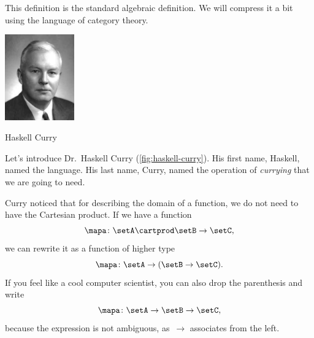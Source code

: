 This definition is the standard algebraic definition.
We will compress it a bit using the language of category theory.

\begin{marginfigure}
    \includegraphics[width=3cm]{../../../pics/haskell.jpg}
    \caption{Haskell Curry}
    \label{fig:haskell-curry}
\end{marginfigure}

Let's introduce Dr.~Haskell Curry (\cref{fig:haskell-curry}).
His first name,  Haskell, named the language.
His last name, Curry, named the operation of \emph{currying} that we are going to need.

Curry noticed that for describing the domain of a function, we do not need to have the Cartesian product.
If we have a function
\begin{equation}
    \label{eq:currying-1}
    \mapa \colon \setA \cartprod \setB \to \setC,
\end{equation}
we can rewrite it as a function of higher type
\begin{equation}
    \label{eq:currying-2}
    \mapa \colon \setA \to ( \setB \to \setC).
\end{equation}
If you feel like a cool computer scientist, you can also drop the parenthesis and write
\begin{equation}
    \label{eq:currying-3}
    \mapa \colon \setA \to \setB \to \setC,
\end{equation}
because the expression is not ambiguous, as~$\to$ associates from the left.





